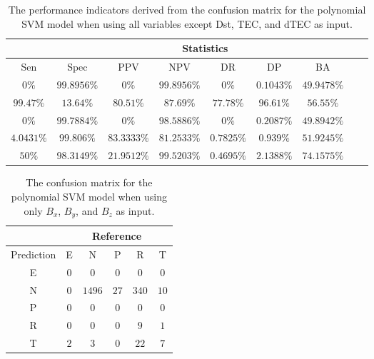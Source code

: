 \begin{table}[!ht]
	\centering
	\begin{tabular}{|c|c|c|c|c|c|c|c|c|}
		\hline
		 & \multicolumn{7}{c|}{Statistics} \\ \hline
		Sen & Spec & PPV & NPV & DR & DP & BA \\ \hline
		$0\%$ & $99.8956\%$ & $0\%$ & $99.8956\%$ & $0\%$ & $0.1043\%$ & $49.9478\%$ \\ \hline
		$99.47\%$ & $13.64\%$ & $80.51\%$ & $87.69\%$ & $77.78\%$ & $96.61\%$ & $56.55\%$ \\ \hline
		$0\%$ & $99.7884\%$ & $0\%$ & $98.5886\%$ & $0\%$ & $0.2087\%$ & $49.8942\%$ \\ \hline
		$4.0431\%$ & $99.806\%$ & $83.3333\%$ & $81.2533\%$ & $0.7825\%$ & $0.939\%$ & $51.9245\%$ \\ \hline
		$50\%$ & $98.3149\%$ & $21.9512\%$ & $99.5203\%$ & $0.4695\%$ & $2.1388\%$ & $74.1575\%$ \\ \hline
	\end{tabular}
	\caption{The performance indicators derived from the confusion matrix for the polynomial SVM model when using all variables except Dst, TEC, and dTEC as input.}
	\label{tab:cs:noTEC:svmPoly}
\end{table}

\begin{table}[!ht]
	\centering
	\begin{tabular}{|c|c|c|c|c|c|}
		\hline
		 & \multicolumn{5}{|c|}{Reference} \\ \hline
		 Prediction & E & N & P & R & T \\ \hline
		 E & $0$ & $0$ & $0$ & $0$ & $0$ \\ \hline
		 N & $0$ & $1496$ & $27$ & $340$ & $10$ \\ \hline
		 P & $0$ & $0$ & $0$ & $0$ & $0$ \\ \hline
		 R & $0$ & $0$ & $0$ & $9$ & $1$ \\ \hline
		 T & $2$ & $3$ & $0$ & $22$ & $7$ \\ \hline
	\end{tabular}
	\caption{The confusion matrix for the polynomial SVM model when using only $B_{x}$, $B_{y}$, and $B_{z}$ as input.}
	\label{tab:cm:coord:svmPoly}
\end{table}

